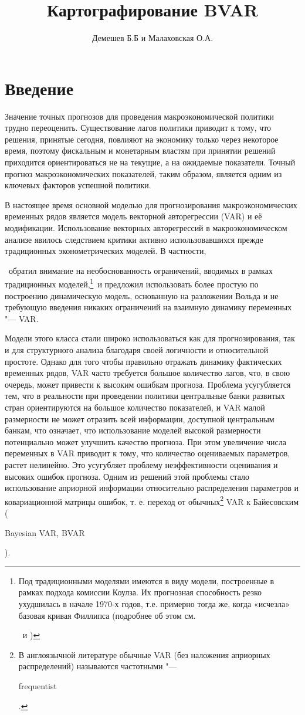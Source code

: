 \documentclass[11pt]{article} %
\title{Картографирование BVAR}
\author{Демешев Б.Б и Малаховская О.А.}
\newcommand{\eng}[1]{\begin{otherlanguage}{english}#1\end{otherlanguage}}
\begin{document}

\section{Введение}

Значение точных прогнозов для проведения макроэкономической политики трудно переоценить. Существование лагов политики приводит к тому, что решения, принятые сегодня, повлияют на экономику только через некоторое время, поэтому фискальным и монетарным властям при принятии решений приходится ориентироваться не на текущие, а на ожидаемые показатели. Точный прогноз макроэкономических показателей, таким образом, является одним из ключевых факторов успешной политики.

В настоящее время основной моделью для прогнозирования макроэкономических временных рядов является модель векторной  авторегрессии (VAR) и её модификации. Использование векторных авторегрессий в макроэкономическом анализе явилось следствием критики активно использовавшихся прежде традиционных эконометрических моделей. В частности, \eng{\cite{sims_1980}}~обратил внимание на необоснованность ограничений, вводимых в рамках традиционных моделей,\footnote{Под традиционными моделями имеются в виду модели, построенные в рамках подхода комиссии Коулза. Их прогнозная способность резко ухудшилась в начале 1970-х годов, т.е. примерно тогда же, когда «исчезла» базовая кривая Филлипса (подробнее об этом см. \eng{\cite{favero_2001}}~и  \cite{malakhovskaya_pekarsky_rus_2012})}~и предложил использовать более простую по построению динамическую модель, основанную на разложении Вольда и не требующую введения никаких ограничений на взаимную динамику переменных "--- VAR.

 Модели этого класса стали широко использоваться как для прогнозирования, так и для структурного анализа благодаря своей логичности и относительной простоте.   Однако для того чтобы правильно отражать динамику фактических временных рядов, VAR часто требуется большое количество лагов, что, в свою очередь, может привести к высоким ошибкам прогноза. Проблема усугубляется тем, что в реальности при проведении политики центральные банки развитых стран ориентируются на большое количество показателей, и VAR малой размерности не может отразить всей информации, доступной центральным банкам, что  означает, что использование моделей высокой размерности потенциально может улучшить качество прогноза. При этом увеличение числа переменных в VAR приводит к тому, что количество оцениваемых параметров, растет нелинейно. Это усугубляет проблему неэффективности оценивания и высоких ошибок прогноза.
Одним из решений этой проблемы стало использование априорной информации относительно распределения параметров и ковариационной матрицы ошибок, т. е. переход от обычных\footnote{В англоязычной литературе обычные VAR (без наложения априорных распределений) называются частотными "--- \eng{frequentist}.} VAR к Байесовским (\eng{Bayesian VAR, BVAR}).
\end{document}
